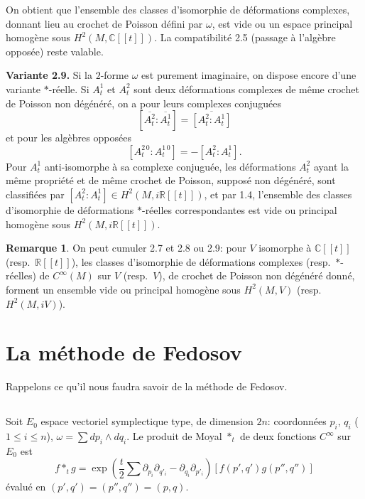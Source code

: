 \documentclass[11pt,a4paper]{article}
\theoremstyle{plain}
\theoremstyle{definition}
\newtheorem{remark}[theorem]{Remarque}
\newcommand{\R}{\mathbb{R}}
\newcommand{\C}{\mathbb{C}}
\begin{document}
On obtient que l'ensemble des classes d'isomorphie de d\'eformations complexes,
donnant lieu au crochet de Poisson d\'efini par $\omega$, est vide ou un espace principal homog\`ene sous $H^{2}(M, \C[[t]])$. La compatibilit\'e 2.5 (passage \`a l'alg\`ebre oppos\'ee) reste valable.

\noindent \textbf{Variante 2.9.} Si la $2$-forme $\omega$ est purement imaginaire, on dispose encore d'une
variante $*$-r\'eelle. Si $A_{t}^{1}$ et $A_{t}^{2}$ sont deux d\'eformations complexes de m\^eme crochet de Poisson non d\'eg\'en\'er\'e, on a pour leurs complexes conjugu\'ees
\[
[\overline{A_{t}^{2}} : \overline{A_{t}^{1}}] = \overline{[A_{t}^{2} : A_{t}^{1}]}
\]
et pour les alg\`ebres oppos\'ees
\[
[A_{t}^{2\,0} : A_{t}^{1\,0}] = -[A_{t}^{2} : A_{t}^{1}].
\]
Pour $A_{t}^{1}$ anti-isomorphe \`a sa complexe conjugu\'ee, les d\'eformations $A_{t}^{2}$ ayant la m\^eme propri\'et\'e et de m\^eme crochet de Poisson, suppos\'e non d\'eg\'en\'er\'e, sont classifi\'ees par $[A_{t}^{2} : A_{t}^{1}] \in H^{2}(M, i\R[[t]])$, et par 1.4, l'ensemble des classes d'isomorphie de d\'eformations $*$-r\'eelles correspondantes est vide ou principal homog\`ene sous $H^{2}(M, i\R[[t]])$.

\begin{remark}
On peut cumuler 2.7 et 2.8 ou 2.9: pour $V$ isomorphe \`a $\C[[t]]$
(resp.~$\R[[t]]$), les classes d'isomorphie de d\'eformations complexes (resp.~$*$-r\'eelles) de
$C^{\infty}(M)$ sur $V$ (resp.~$V$), de crochet de Poisson non d\'eg\'en\'er\'e donn\'e, forment un
ensemble vide ou principal homog\`ene sous $H^{2}(M, V)$ (resp.~$H^{2}(M, iV)$).
\end{remark}

\section{La m\'ethode de Fedosov}

Rappelons ce qu'il nous faudra savoir de la m\'ethode de Fedosov.

\subsection{}
Soit $E_{0}$ espace vectoriel symplectique type, de dimension $2n$: coordonn\'ees $p_{i}$,
$q_{i}$ ($1 \leq i \leq n$), $\omega = \sum dp_{i} \wedge dq_{i}$. Le produit de Moyal $*_{t}$ de deux fonctions $C^{\infty}$ sur $E_{0}$
est
\[
f *_{t} g = \exp\left(\frac{t}{2} \sum \partial_{p_{i}} \partial_{q'_{i}} - \partial_{q_{i}} \partial_{p'_{i}}\right) [f(p',q') g(p'',q'')]
\]
\'evalu\'e en $(p',q') = (p'',q'') = (p,q)$.
\end{document}
